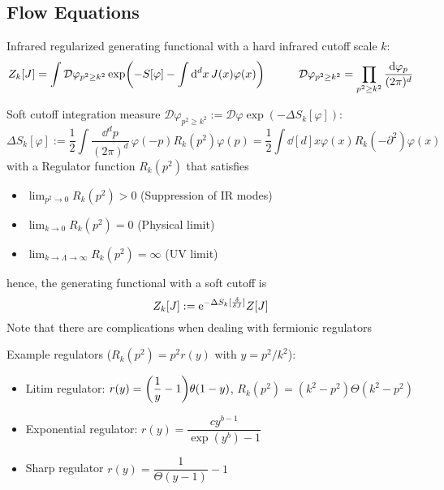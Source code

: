 	\subsection{Flow Equations}
		Infrared regularized generating functional with a hard infrared cutoff scale $k$:
		\begin{equation}
			Z_k[J] = \int \mathcal{D}\varphi_{p^2 \ge k^2} \exp(-S[\varphi] - \int \dd^d x \, J(x) \varphi(x))
			\hspace{30pt} \mathcal{D}\varphi_{p^2 \ge k^2} = \prod_{p^2 \ge k^2} \frac{\dd \varphi_p}{(2\pi)^d}
		\end{equation}

		\noindent
		Soft cutoff integration measure $\mathcal{D}\varphi_{p^2 \ge k^2} := \mathcal{D}\varphi \exp(-\Delta S_k[\varphi])$:
		\begin{equation}
			\Delta S_k[\varphi] 
			:= \frac{1}{2} \int \frac{\dd^d p}{(2\pi)^d}\, \varphi(-p) R_k(p^2) \varphi(p) 
			= \frac{1}{2} \int \dd[d]{x} \varphi(x) R_k(-\partial^2) \varphi(x)
		\end{equation}
		with a Regulator function $R_k(p^2)$ that satisfies
		\begin{itemize}\itemsep -0pt
			\item $\displaystyle\lim_{p^2 \to 0} R_k(p^2) > 0$ \hfill{(Suppression of IR modes)}
			\item $\displaystyle\lim_{k \to 0} R_k(p^2) = 0$ \hfill{(Physical limit)}
			\item $\displaystyle\lim_{k \to \Lambda \to \infty} R_k(p^2) = \infty$ \hfill{(UV limit)}
		\end{itemize}
		hence, the generating functional with a soft cutoff is
		\begin{equation}
			Z_k[J] := \ex^{-\Delta S_k [\fdv{J}]}Z[J]
		\end{equation}
		Note that there are complications when dealing with fermionic regulators

		\noindent
		Example regulators ($R_k(p^2) = p^2 r(y)$ with $y=p^2/k^2$):
		\begin{itemize} \itemsep -0pt
			\item Litim regulator: $r(y) = \qty(\dfrac{1}{y}-1)\theta(1-y)$, \ie $R_k(p^2) = (k^2 - p^2) \Theta(k^2 - p^2)$
			\item Exponential regulator: $r(y) = \dfrac{cy^{b-1}}{\exp(y^b) - 1}$
			\item Sharp regulator $r(y) = \dfrac{1}{\Theta(y-1)}-1$
		\end{itemize}

